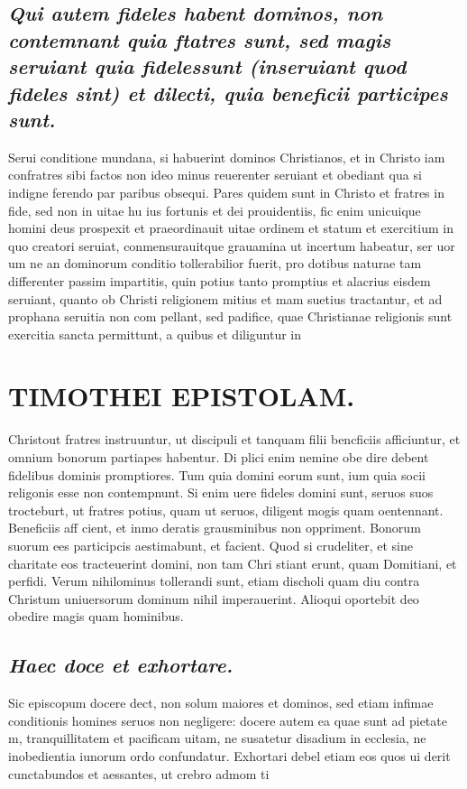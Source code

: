 \documentclass{article}
\begin{document}
\begin{pages}
\subsection*{\textit{Qui autem fideles habent dominos, non contemnant quia ftatres sunt, sed magis seruiant quia fidelessunt (inseruiant quod fideles sint) et dilecti, quia beneficii participes sunt. }}\pstart Serui conditione mundana, si habuerint dominos Christianos, et in Christo iam confratres sibi factos non ideo minus reuerenter seruiant et obediant qua si indigne ferendo par paribus obsequi. Pares quidem sunt in Christo et fratres in fide, sed non in uitae hu ius fortunis et dei prouidentiis, fic enim unicuique  homini deus prospexit et praeordinauit uitae ordinem et statum et exercitium in quo creatori seruiat, conmensurauitque grauamina ut incertum habeatur, ser uor um ne an dominorum conditio tollerabilior fuerit, pro dotibus naturae tam differenter passim impartitis, quin potius tanto promptius et alacrius eisdem seruiant, quanto ob Christi religionem mitius et mam suetius tractantur, et ad prophana seruitia non com pellant, sed padifice, quae Christianae religionis sunt exercitia sancta permittunt, a quibus et diliguntur in  \pend
\section*{TIMOTHEI EPISTOLAM. }
\marginpar{[ p.155 ]}\pstart Christout fratres instruuntur, ut discipuli et tanquam filii bencficiis afficiuntur, et omnium bonorum partiapes habentur. Di plici enim nemine obe dire debent fidelibus dominis promptiores. Tum quia domini eorum sunt, ium quia socii religonis esse non contempnunt. Si enim uere fideles domini sunt, seruos suos trocteburt, ut fratres potius, quam ut seruos, diligent mogis quam oentennant. Beneficiis aff cient, et inmo deratis grausminibus non oppriment. Bonorum suorum ees participcis aestimabunt, et facient. Quod si crudeliter, et sine charitate eos tracteuerint domini, non tam Chri stiant erunt, quam Domitiani, et perfidi. Verum nihilominus tollerandi sunt, etiam discholi quam diu contra Christum uniuersorum dominum nihil imperauerint. Alioqui oportebit deo obedire magis quam hominibus.  \pend
{}
{}
\subsection*{\textit{Haec doce et exhortare. }}\pstart Sic episcopum docere dect, non solum maiores et dominos, sed etiam infimae conditionis homines seruos non negligere: docere autem ea quae sunt ad pietate m, tranquillitatem et pacificam uitam, ne susatetur disadium in ecclesia, ne inobedientia iunorum ordo confundatur. Exhortari debel etiam eos quos ui derit cunctabundos et aessantes, ut crebro admom ti  \pend

\end{pages}
\end{document}
